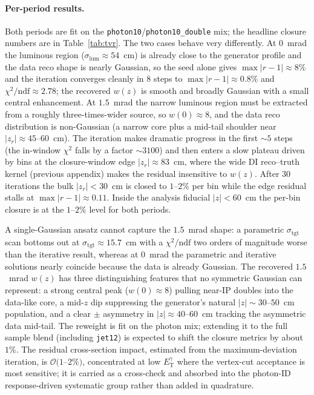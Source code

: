 \documentclass[11pt]{article}
\newcommand{\ETg}{E_{\mathrm{T}}^{\gamma}}
\begin{document}
\paragraph{Per-period results.} Both periods are fit on the
\texttt{photon10}/\texttt{photon10\_double} mix; the headline closure numbers are
in Table~\ref{tab:tvr}. The two cases behave very differently. At $0$~mrad the
luminous region ($\sigma_{\mathrm{lum}}\approx54$~cm) is already close to the
generator profile and the data reco shape is nearly Gaussian, so the seed alone
gives $\max|r-1|\approx8\%$ and the iteration converges cleanly in $8$ steps to
$\max|r-1|\approx0.8\%$ and $\chi^2/\mathrm{ndf}\approx2.78$; the recovered $w(z)$
is smooth and broadly Gaussian with a small central enhancement. At $1.5$~mrad the
narrow luminous region must be extracted from a roughly three-times-wider source,
so $w(0)\approx8$, and the data reco distribution is non-Gaussian (a narrow core
plus a mid-tail shoulder near $|z_r|\approx45$--$60$~cm). The iteration makes
dramatic progress in the first $\sim5$ steps (the in-window $\chi^2$ falls by a
factor $\sim3100$) and then enters a slow plateau driven by bins at the
closure-window edge $|z_r|\approx83$~cm, where the wide DI reco--truth kernel
(previous appendix) makes the residual insensitive to $w(z)$. After $30$ iterations
the bulk $|z_r|<30$~cm is closed to $1$--$2\%$ per bin while the edge residual
stalls at $\max|r-1|\approx0.11$. Inside the analysis fiducial $|z|<60$~cm the
per-bin closure is at the $1$--$2\%$ level for both periods.

A single-Gaussian ansatz cannot capture the $1.5$~mrad shape: a parametric
$\sigma_{\mathrm{tgt}}$ scan bottoms out at $\sigma_{\mathrm{tgt}}\approx15.7$~cm
with a $\chi^2/\mathrm{ndf}$ two orders of magnitude worse than the iterative
result, whereas at $0$~mrad the parametric and iterative solutions nearly coincide
because the data is already Gaussian. The recovered $1.5$~mrad $w(z)$ has three
distinguishing features that no symmetric Gaussian can represent: a strong central
peak ($w(0)\approx8$) pulling near-IP doubles into the data-like core, a mid-$z$
dip suppressing the generator's natural $|z|\sim30$--$50$~cm population, and a
clear $\pm$ asymmetry in $|z|\approx40$--$60$~cm tracking the asymmetric data
mid-tail. The reweight is fit on the photon mix; extending it to the full sample
blend (including \texttt{jet12}) is expected to shift the closure metrics by about
$1\%$. The residual cross-section impact, estimated from the maximum-deviation
iteration, is $\mathcal{O}(1$--$2\%)$, concentrated at low $\ETg$ where the
vertex-cut acceptance is most sensitive; it is carried as a cross-check and
absorbed into the photon-ID response-driven systematic group rather than added in
quadrature.
\end{document}
